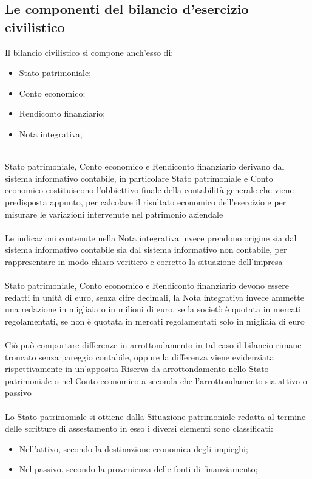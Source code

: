 \documentclass{report}
\begin{document}
\subsection{Le componenti del bilancio d'esercizio civilistico} %
\label{sub:Le componenti del bilancio d'esercizio civilistico}
Il bilancio civilistico si compone anch'esso di:
\\
\begin{itemize}
  \item{Stato patrimoniale;}
  \item{Conto economico;}
  \item{Rendiconto finanziario;}
  \item{Nota integrativa;}
\end{itemize}
\\
Stato patrimoniale, Conto economico e Rendiconto finanziario derivano dal sistema informativo contabile, in particolare Stato patrimoniale e Conto economico costituiscono l'obbiettivo finale della contabilità generale che viene predisposta appunto, per calcolare il risultato economico dell'esercizio e per misurare le variazioni intervenute nel patrimonio aziendale
\\
\\
Le indicazioni contenute nella Nota integrativa invece prendono origine sia dal sistema informativo contabile sia dal sistema informativo non contabile, per rappresentare in modo chiaro veritiero e corretto la situazione dell'impresa
\\
\\
Stato patrimoniale, Conto economico e Rendiconto finanziario devono essere redatti in unità di euro, senza cifre decimali, la Nota integrativa invece ammette una redazione in migliaia o in milioni di euro, se la societò è quotata in mercati regolamentati, se non è quotata in mercati regolamentati solo in migliaia di euro
\\
\\
Ciò può comportare differenze in arrottondamento in tal caso il bilancio rimane troncato senza pareggio contabile, oppure la differenza viene evidenziata rispettivamente in un'apposita Riserva da arrottondamento nello Stato patrimoniale o nel Conto economico a seconda che l'arrottondamento sia attivo o passivo
\\
\\
Lo Stato patrimoniale si ottiene dalla Situazione patrimoniale redatta al termine delle scritture di assestamento in esso i diversi elementi sono classificati:
\\
\begin{itemize}
  \item{Nell'attivo, secondo la destinazione economica degli impieghi;}
  \item{Nel passivo, secondo la provenienza delle fonti di finanziamento;}
\end{itemize}
\end{document}
